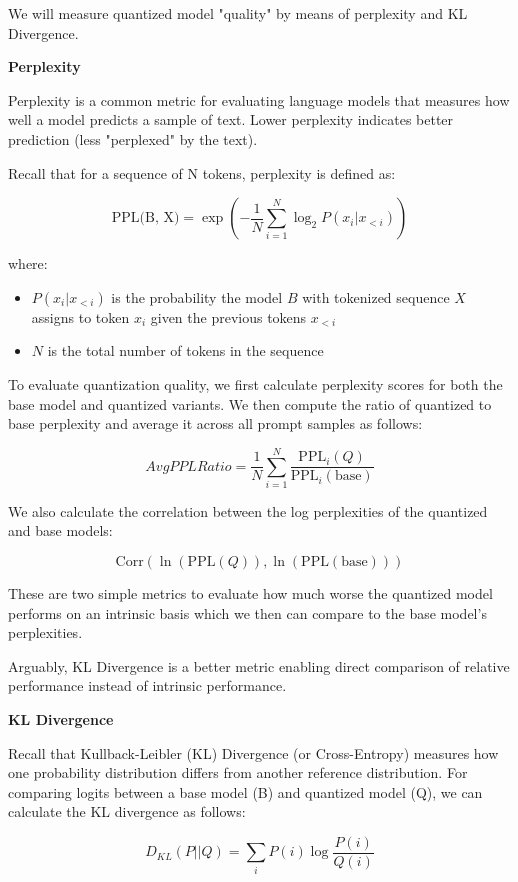We will measure quantized model "quality" by means of perplexity and KL Divergence.

\textbf{Perplexity}

Perplexity is a common metric for evaluating language models that measures how well a model predicts a sample of text. Lower perplexity indicates better prediction (less "perplexed" by the text).

Recall that for a sequence of N tokens, perplexity is defined as:

$$ \text{PPL(B, X)} = \exp\left(-\frac{1}{N}\sum_{i=1}^{N} \log_2 P(x_i|x_{<i})\right) $$

where:
\begin{itemize}
\item $P(x_i|x_{<i})$ is the probability the model $B$ with tokenized sequence $X$ assigns to token $x_i$ given the previous tokens $x_{<i}$
\item $N$ is the total number of tokens in the sequence
\end{itemize}

To evaluate quantization quality, we first calculate perplexity scores for both the base model and quantized variants. We then compute the ratio of quantized to base perplexity and average it across all prompt samples as follows:

$$ Avg PPL Ratio = \frac{1}{N}\sum_{i=1}^{N} \frac{\text{PPL}_i(Q)}{\text{PPL}_i(\text{base})} $$

We also calculate the correlation between the log perplexities of the quantized and base models:

$$ \text{Corr}(\ln(\text{PPL}(Q)), \ln(\text{PPL}(\text{base}))) $$

These are two simple metrics to evaluate how much worse the quantized model performs on an intrinsic basis which we then can compare to the base model's perplexities.

Arguably, KL Divergence is a better metric enabling direct comparison of relative performance instead of intrinsic performance.

\textbf{KL Divergence}

Recall that Kullback-Leibler (KL) Divergence (or Cross-Entropy) measures how one probability distribution differs from another reference distribution. For comparing logits between a base model (B) and quantized model (Q), we can calculate the KL divergence as follows:

$$ D_{KL}(P||Q) = \sum_{i} P(i) \log \frac{P(i)}{Q(i)} $$

